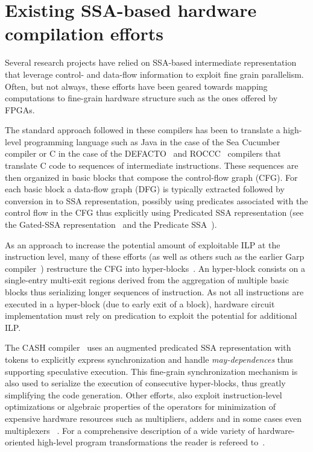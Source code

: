 \section{Existing SSA-based hardware compilation efforts}
Several research projects have relied on SSA-based intermediate representation that leverage control- and data-flow information to exploit fine grain parallelism. Often, but not always, these efforts have been geared towards mapping computations to fine-grain hardware structure such as the ones offered by FPGAs.

The standard approach followed in these compilers has been to translate a high-level programming language such as Java in the case of the Sea Cucumber~\cite{Tripp:FPL02} compiler or C in the case of the DEFACTO~\cite{DEFACTO:2005} and ROCCC~\cite{Najjar:ROCCC08} compilers that translate C code to sequences of intermediate instructions. These sequences are then organized in basic blocks that compose the control-flow graph (CFG). For each basic block a data-flow graph (DFG) is typically extracted followed by conversion in to SSA representation, possibly using predicates associated with the control flow in the CFG thus explicitly using Predicated SSA representation (see the Gated-SSA representation~\cite{Tu-SC95} and the Predicate SSA~\cite{Carter:PACT99,deFerriere:SCOPES07,Stoutchinin:2001:MICRO}).

As an approach to increase the potential amount of exploitable ILP at the instruction level, many of these efforts (as well as others such as the earlier Garp compiler~\cite{Callahan:Computer00}) restructure the CFG into hyper-blocks~\cite{Mahlke:Micro92}.  An hyper-block consists on a single-entry multi-exit regions derived from the aggregation of multiple basic blocks thus serializing longer sequences of instruction. 
As not all instructions are executed in a hyper-block (due to early exit of a block), hardware circuit implementation must rely on predication to exploit the potential for additional ILP. 


The CASH compiler~\cite{Budiu:FPL02} uses an augmented predicated SSA representation with tokens to explicitly express synchronization and handle {\em may-dependences} thus supporting speculative execution.  This fine-grain synchronization mechanism is also used to serialize the execution of consecutive hyper-blocks, thus greatly simplifying the code generation. Other efforts, also exploit instruction-level optimizations or algebraic properties of the operators for minimization of expensive hardware resources such as multipliers, adders and in some cases even multiplexers ~\cite{Verma08,Nancekievill05}. For a comprehensive description of a wide variety of hardware-oriented high-level program transformations the reader is refereed to~\cite{Cardoso:2008}.

